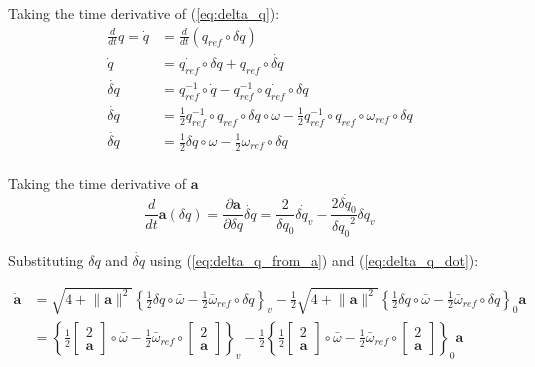 \documentclass[a4paper]{paper}
\begin{document}
Taking the time derivative of (\ref{eq:delta_q}):
\begin{equation}
\begin{split}
    \frac{d}{dt} q = \dot q
    &= \frac{d}{dt} (q_{ref} \circ \delta q)\\
    \dot q &= \dot{q_{ref}} \circ \delta q + q_{ref} \circ \dot{\delta q} \\
    \dot{\delta q} &= q_{ref}^{-1} \circ \dot q - q_{ref}^{-1} \circ \dot{q_{ref}} \circ \delta q \\  %
    \dot{\delta q} &= \frac{1}{2} q_{ref}^{-1} \circ  q_{ref} \circ \delta q \circ \omega
        - \frac{1}{2} q_{ref}^{-1} \circ q_{ref} \circ \omega_{ref} \circ \delta q \\
    \dot{\delta q} &= \frac{1}{2} \delta q \circ \omega - \frac{1}{2} \omega_{ref} \circ \delta q \\
\end{split}
\label{eq:delta_q_dot}
\end{equation}

Taking the time derivative of $\bm{a}$
\begin{equation}
    \frac{d}{dt} \bm{a}(\delta q) = \frac{\partial \bm{a}}{\partial \delta q} \dot{\delta q}
    = \frac{2}{\delta q_0} \dot{\delta q_v} - \frac{2 \dot{\delta q_0}}{{\delta q_0}^2} \delta q_v
\end{equation}

Substituting $\delta q$ and $\dot{\delta q}$ using (\ref{eq:delta_q_from_a}) and (\ref{eq:delta_q_dot}):

\begin{equation}
    \begin{split}
    \dot{\bm{a}} &=
        \sqrt{4+\lVert\bm{a}\rVert^2}
        \left\{ \frac{1}{2}\delta q \circ \bar \omega - \frac{1}{2} \bar \omega_{ref}\circ \delta q \right\}_v
        -  \frac{1}{2} \sqrt{4+\lVert\bm{a}\rVert^2} \left\{ \frac{1}{2}\delta q \circ \bar \omega - \frac{1}{2} \bar \omega_{ref}\circ \delta q \right\}_0 \bm{a} \\
    &= \left\{
            \frac{1}{2}
            \left[ \begin{array}{c} 2 \\ \bm{a} \end{array} \right]
            \circ \bar \omega
            - \frac{1}{2}
            \bar \omega_{ref} \circ
            \left[ \begin{array}{c} 2 \\ \bm{a} \end{array} \right]
        \right\}_v
        - \frac{1}{2} \left\{
            \frac{1}{2}
            \left[ \begin{array}{c} 2 \\ \bm{a} \end{array} \right]
            \circ \bar \omega
            - \frac{1}{2}
            \bar \omega_{ref} \circ
            \left[ \begin{array}{c} 2 \\ \bm{a} \end{array} \right]
        \right\}_0 \bm{a} \\
\end{split}
\end{equation}
\end{document}
